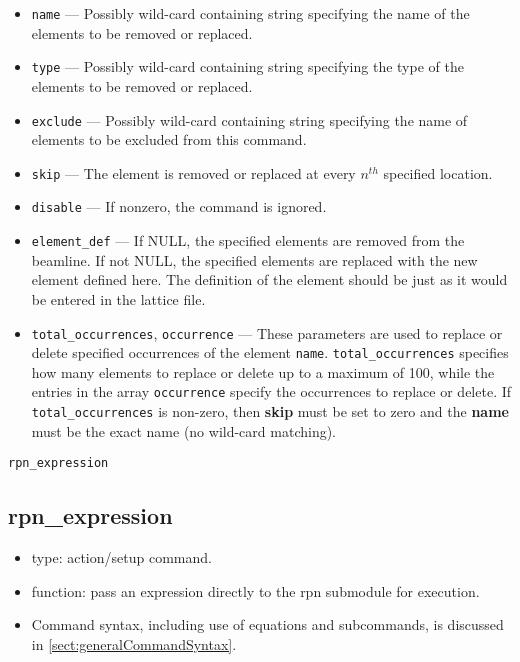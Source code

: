 \documentclass[11pt]{article}
\begin{document}
\begin{itemize}
\item \verb|name| --- Possibly wild-card containing string specifying the
	name of the elements to be removed or replaced.
\item \verb|type| --- Possibly wild-card containing string specifying the
   type of the elements to be removed or replaced.
\item \verb|exclude| --- Possibly wild-card containing string specifying 
	the name of elements to be excluded from this command.
\item \verb|skip| --- The element is removed or replaced at every $n^{th}$ 
   specified location.
\item \verb|disable| --- If nonzero, the command is ignored.
\item \verb|element_def| --- If NULL, the specified elements are removed from
   the beamline. If not NULL, the specified elements are replaced with the new element
   defined here. The definition of the element should be just as it would be entered in 
   the lattice file.
\item \verb|total_occurrences|, \verb|occurrence| --- 
These parameters are used to replace or delete specified occurrences of 
the element \verb|name|.  \verb|total_occurrences| specifies how many elements to replace
or delete up to a maximum of 100, while the entries in the array \verb|occurrence| specify the occurrences
to replace or delete. If \verb|total_occurrences| is non-zero, then {\bf skip} must
be set to zero  and the {\bf name} must be the exact name (no wild-card matching). 
\end{itemize}

\newpage
\begin{center}{\Large\verb|rpn_expression|}\end{center}
\subsection{rpn\_expression \label{subsec:rpnexpression}}

\begin{itemize}
\item type: action/setup command.
\item function: pass an expression directly to the rpn submodule for execution.
\item Command syntax, including use of equations and subcommands, is discussed in \ref{sect:generalCommandSyntax}.
\end{itemize}
\end{document}
